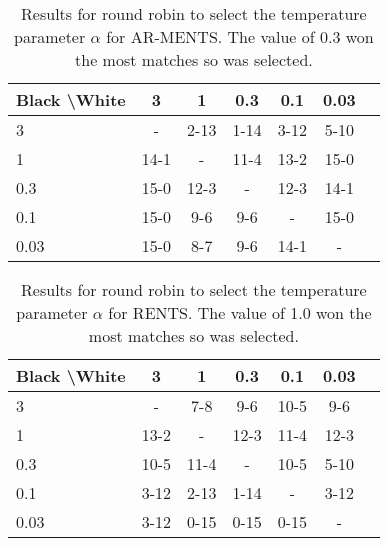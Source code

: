 \documentclass{article}
\theoremstyle{plain}
\begin{document}
\begin{appendices}
            \begin{table*}[]
            \centering
                \begin{tabular}{l|cccccc}
                    \textbf{Black \textbackslash White}     & 3  & 1   & 0.3   & 0.1    & 0.03    \\ 
                    \hline
                                            3            & -     	&  2-13 		& 1-14  		& 3-12  		& 5-10  		\\
                                            1            &  14-1 		& -     	& 11-4 		& 13-2  		& 15-0  		\\
                                            0.3          &  15-0  	&  12-3  	&   -   &  12-3 		& 14-1  		\\
                                            0.1          &   15-0		&  9-6 		&  9-6 		& -     	&  15-0 		\\
                                            0.03         &   15-0		&  8-7 		&  9-6 		& 14-1  		&   -   	\\    
                \end{tabular}
                \caption{Results for round robin to select the temperature parameter $\alpha$ for AR-MENTS. The value of 0.3 won the most matches so was selected. \label{tab:x040}}
            \end{table*}
            
            \begin{table*}[]
            \centering
                \begin{tabular}{l|cccccc}
                    \textbf{Black \textbackslash White}     & 3  & 1   & 0.3   & 0.1    & 0.03    \\ 
                    \hline
                                            3            & -     	&   	7-8	&  9-6 		&  10-5 		&  9-6 		\\
                                            1            &  13-2 		& -     	& 12-3 		& 11-4  		&  12-3 		\\
                                            0.3          &   10-5 	& 11-4   	&   -   &  10-5 		&  5-10 		\\
                                            0.1          &   3-12		&  2-13 		& 1-14  		& -     	&  3-12 		\\
                                            0.03         &   3-12		&  0-15 		&  0-15 		&  0-15 		&   -   	\\    
                \end{tabular}
                \caption{Results for round robin to select the temperature parameter $\alpha$ for RENTS. The value of 1.0 won the most matches so was selected. \label{tab:w050}}
            \end{table*}
            

\end{appendices}
\end{document}
